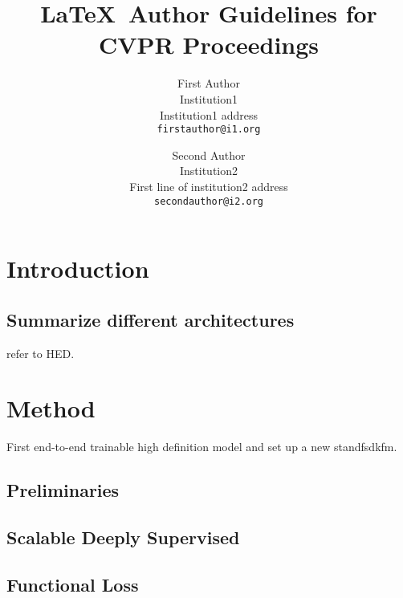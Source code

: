 \documentclass[10pt,twocolumn,letterpaper]{article}
\begin{document}
\title{\LaTeX\ Author Guidelines for CVPR Proceedings}

\author{First Author\\
Institution1\\
Institution1 address\\
{\tt\small firstauthor@i1.org}
\and
Second Author\\
Institution2\\
First line of institution2 address\\
{\tt\small secondauthor@i2.org}
}

\maketitle

\begin{abstract}
	
\end{abstract}


\section{Introduction}
\subsection{Summarize different architectures}
refer to HED.

\section{Method}
First end-to-end trainable high definition model and set up a new standfsdkfm.

\subsection{Preliminaries}

\subsection{Scalable Deeply Supervised}

\subsection{Functional Loss}
\end{document}
